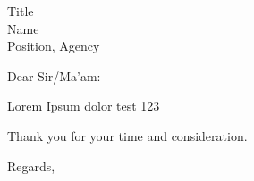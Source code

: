 \documentclass{letter}
\begin{document}
\begin{letter}{Title \\ Name \\ Position, Agency}
\opening{Dear Sir/Ma'am:}

Lorem Ipsum dolor test 123


Thank you for your time and consideration.
\\
\closing{Regards,}





\end{letter}
\end{document}
